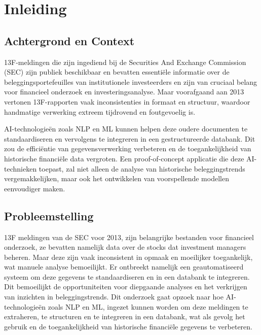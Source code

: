 


% 

\section{Inleiding}
\label{sec:inleiding}
\subsection{Achtergrond en Context}

13F-meldingen die zijn ingediend bij de Securities And Exchange Commission (SEC) zijn publiek beschikbaar en bevatten essentiële informatie over de beleggingsportefeuilles van institutionele investeerders en zijn van cruciaal belang voor financieel onderzoek en investeringsanalyse. Maar voorafgaand aan 2013 vertonen 13F-rapporten vaak inconsistenties in formaat en structuur, waardoor handmatige verwerking extreem tijdrovend en foutgevoelig is. 

AI-technologieën zoals NLP en ML kunnen helpen deze oudere documenten te standaardiseren en vervolgens te integreren in een gestructureerde databank. Dit zou de efficiëntie van gegevensverwerking verbeteren en de toegankelijkheid van historische financiële data vergroten. Een proof-of-concept applicatie die deze AI-technieken toepast, zal niet alleen de analyse van historische beleggingstrends vergemakkelijken, maar ook het ontwikkelen van voorspellende modellen eenvoudiger maken.

\subsection{Probleemstelling}

13F meldingen van de SEC voor 2013, zijn belangrijke bestanden voor financieel onderzoek, ze bevatten namelijk data over de stocks dat investment managers beheren. Maar deze zijn vaak inconsistent in opmaak en moeilijker toegankelijk, wat manuele analyse bemoeilijkt. Er ontbreekt namelijk een geautomatiseerd systeem om deze gegevens te standaardiseren en in een databank te integreren. Dit bemoeilijkt de opportuniteiten voor diepgaande analyses en het verkrijgen van inzichten in beleggingstrends. Dit onderzoek gaat opzoek naar hoe AI-technologieën zoals NLP en ML, ingezet kunnen worden om deze meldingen te extraheren, te structuren en te integreren in een databank, wat als gevolg het gebruik en de toegankelijkheid van historische financiële gegevens te verbeteren.

